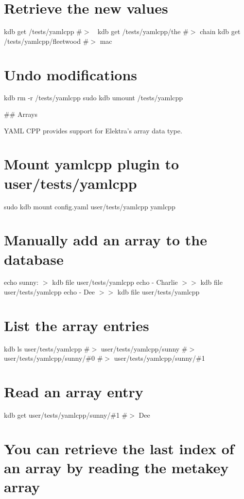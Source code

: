 \section*{Retrieve the new values}

kdb get /tests/yamlcpp \#$>$ 🎵 kdb get /tests/yamlcpp/the \#$>$ chain kdb get /tests/yamlcpp/fleetwood \#$>$ mac

\section*{Undo modifications}

kdb rm -\/r /tests/yamlcpp sudo kdb umount /tests/yamlcpp 
\begin{DoxyCode}
## Arrays

YAML CPP provides support for Elektra’s array data type.
\end{DoxyCode}
 \section*{Mount yamlcpp plugin to {\ttfamily user/tests/yamlcpp}}

sudo kdb mount config.\+yaml user/tests/yamlcpp yamlcpp

\section*{Manually add an array to the database}

echo \textquotesingle{}sunny\+:\textquotesingle{} $>$ {\ttfamily kdb file user/tests/yamlcpp} echo \textquotesingle{} -\/ Charlie\textquotesingle{} $>$$>$ {\ttfamily kdb file user/tests/yamlcpp} echo \textquotesingle{} -\/ Dee\textquotesingle{} $>$$>$ {\ttfamily kdb file user/tests/yamlcpp}

\section*{List the array entries}

kdb ls user/tests/yamlcpp \#$>$ user/tests/yamlcpp/sunny \#$>$ user/tests/yamlcpp/sunny/\#0 \#$>$ user/tests/yamlcpp/sunny/\#1

\section*{Read an array entry}

kdb get user/tests/yamlcpp/sunny/\#1 \#$>$ Dee

\section*{You can retrieve the last index of an array by reading the metakey {\ttfamily array}}

